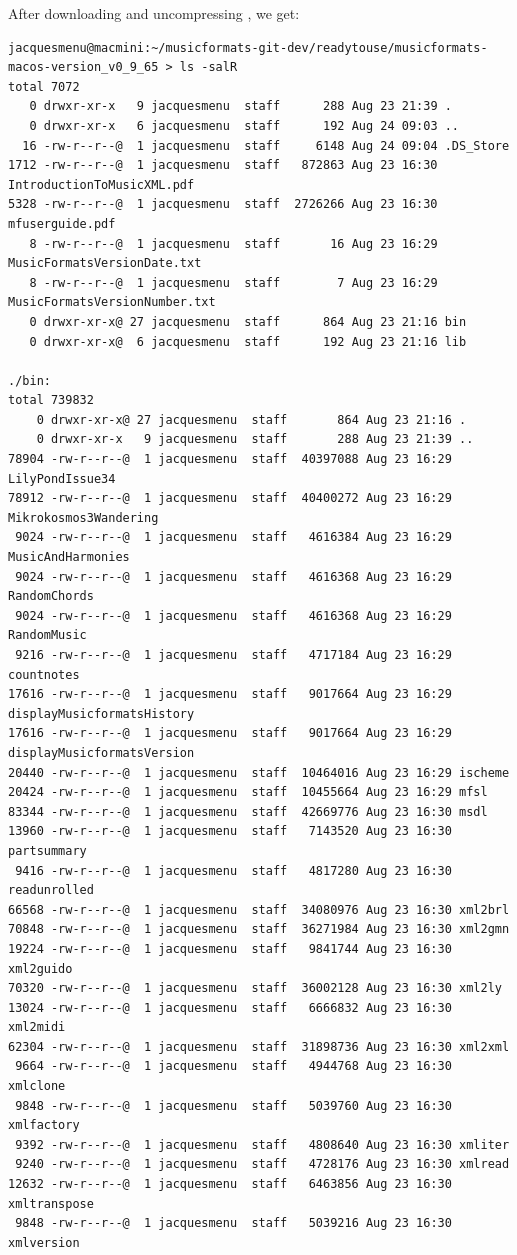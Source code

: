 After downloading and uncompressing , we get:
\begin{lstlisting}[language=Terminal]
jacquesmenu@macmini:~/musicformats-git-dev/readytouse/musicformats-macos-version_v0_9_65 > ls -salR
total 7072
   0 drwxr-xr-x   9 jacquesmenu  staff      288 Aug 23 21:39 .
   0 drwxr-xr-x   6 jacquesmenu  staff      192 Aug 24 09:03 ..
  16 -rw-r--r--@  1 jacquesmenu  staff     6148 Aug 24 09:04 .DS_Store
1712 -rw-r--r--@  1 jacquesmenu  staff   872863 Aug 23 16:30 IntroductionToMusicXML.pdf
5328 -rw-r--r--@  1 jacquesmenu  staff  2726266 Aug 23 16:30 mfuserguide.pdf
   8 -rw-r--r--@  1 jacquesmenu  staff       16 Aug 23 16:29 MusicFormatsVersionDate.txt
   8 -rw-r--r--@  1 jacquesmenu  staff        7 Aug 23 16:29 MusicFormatsVersionNumber.txt
   0 drwxr-xr-x@ 27 jacquesmenu  staff      864 Aug 23 21:16 bin
   0 drwxr-xr-x@  6 jacquesmenu  staff      192 Aug 23 21:16 lib

./bin:
total 739832
    0 drwxr-xr-x@ 27 jacquesmenu  staff       864 Aug 23 21:16 .
    0 drwxr-xr-x   9 jacquesmenu  staff       288 Aug 23 21:39 ..
78904 -rw-r--r--@  1 jacquesmenu  staff  40397088 Aug 23 16:29 LilyPondIssue34
78912 -rw-r--r--@  1 jacquesmenu  staff  40400272 Aug 23 16:29 Mikrokosmos3Wandering
 9024 -rw-r--r--@  1 jacquesmenu  staff   4616384 Aug 23 16:29 MusicAndHarmonies
 9024 -rw-r--r--@  1 jacquesmenu  staff   4616368 Aug 23 16:29 RandomChords
 9024 -rw-r--r--@  1 jacquesmenu  staff   4616368 Aug 23 16:29 RandomMusic
 9216 -rw-r--r--@  1 jacquesmenu  staff   4717184 Aug 23 16:29 countnotes
17616 -rw-r--r--@  1 jacquesmenu  staff   9017664 Aug 23 16:29 displayMusicformatsHistory
17616 -rw-r--r--@  1 jacquesmenu  staff   9017664 Aug 23 16:29 displayMusicformatsVersion
20440 -rw-r--r--@  1 jacquesmenu  staff  10464016 Aug 23 16:29 ischeme
20424 -rw-r--r--@  1 jacquesmenu  staff  10455664 Aug 23 16:29 mfsl
83344 -rw-r--r--@  1 jacquesmenu  staff  42669776 Aug 23 16:30 msdl
13960 -rw-r--r--@  1 jacquesmenu  staff   7143520 Aug 23 16:30 partsummary
 9416 -rw-r--r--@  1 jacquesmenu  staff   4817280 Aug 23 16:30 readunrolled
66568 -rw-r--r--@  1 jacquesmenu  staff  34080976 Aug 23 16:30 xml2brl
70848 -rw-r--r--@  1 jacquesmenu  staff  36271984 Aug 23 16:30 xml2gmn
19224 -rw-r--r--@  1 jacquesmenu  staff   9841744 Aug 23 16:30 xml2guido
70320 -rw-r--r--@  1 jacquesmenu  staff  36002128 Aug 23 16:30 xml2ly
13024 -rw-r--r--@  1 jacquesmenu  staff   6666832 Aug 23 16:30 xml2midi
62304 -rw-r--r--@  1 jacquesmenu  staff  31898736 Aug 23 16:30 xml2xml
 9664 -rw-r--r--@  1 jacquesmenu  staff   4944768 Aug 23 16:30 xmlclone
 9848 -rw-r--r--@  1 jacquesmenu  staff   5039760 Aug 23 16:30 xmlfactory
 9392 -rw-r--r--@  1 jacquesmenu  staff   4808640 Aug 23 16:30 xmliter
 9240 -rw-r--r--@  1 jacquesmenu  staff   4728176 Aug 23 16:30 xmlread
12632 -rw-r--r--@  1 jacquesmenu  staff   6463856 Aug 23 16:30 xmltranspose
 9848 -rw-r--r--@  1 jacquesmenu  staff   5039216 Aug 23 16:30 xmlversion


\end{lstlisting}
